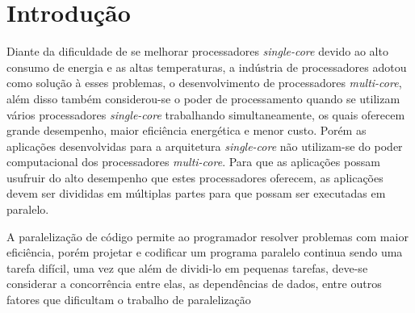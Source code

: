 \chapter{Introdução}

Diante da  dificuldade de se melhorar processadores \textit{single-core} devido ao alto consumo de energia e as altas
temperaturas, a indústria de processadores adotou como solução à esses
problemas, o desenvolvimento de processadores \textit{multi-core},
além disso também considerou-se o poder de processamento quando se utilizam vários processadores \textit{single-core} 
trabalhando simultaneamente, os quais oferecem grande desempenho, maior eficiência energética e menor custo.
Porém as aplicações desenvolvidas para a arquitetura \textit{single-core} não utilizam-se do poder computacional dos processadores \textit{multi-core}.
Para que as aplicações possam usufruir do alto desempenho que estes processadores oferecem, as aplicações devem ser 
divididas em múltiplas partes para que possam ser executadas em paralelo.

A paralelização de código permite ao programador resolver problemas com maior eficiência, porém projetar e codificar um 
programa paralelo continua sendo uma tarefa difícil, uma vez que além de dividi-lo em pequenas tarefas, deve-se considerar a 
concorrência entre elas, as dependências de dados, entre outros fatores que dificultam o trabalho de paralelização 

